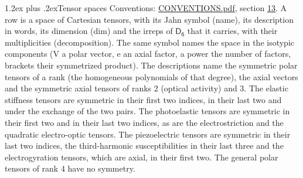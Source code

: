 \documentclass[10pt,a4paper]{article}
\makeatletter
\renewcommand\section{\@startsection{section}{1}{\z@}{-3ex plus -1ex minus -.2ex}%
  {1.2ex plus .2ex}{\normalfont\large\sffamily\bfseries\color{parttitle}}}
\numberwithin{equation}{section}
\newcommand{\grp}[1]{\mathsf{#1}}
\makeatother
\begin{document}
\section{Tensor spaces}\label{s:tensor_spaces}
Conventions: \href{../../CONVENTIONS.pdf}{CONVENTIONS.pdf}, section \href{../../CONVENTIONS.pdf\#conv.13}{13}.
\leavevmode\label{n:head.name}\label{n:head.description}\label{n:head.dim}\label{n:head.decomposition}A row is a space of Cartesian tensors, with its Jahn symbol (name), its description in words, its dimension (dim) and the irreps of $\grp{D_{6}}$ that it carries, with their multiplicities (decomposition). \label{n:label.jahn}The same symbol names the space in the isotypic components (V a polar vector, e an axial factor, a power the number of factors, brackets their symmetrized product). The descriptions name the symmetric polar tensors of a rank (the homogeneous polynomials of that degree), the axial vectors and the symmetric axial tensors of ranks 2 (optical activity) and 3. The elastic stiffness tensors are symmetric in their first two indices, in their last two and under the exchange of the two pairs. The photoelastic tensors are symmetric in their first two and in their last two indices, as are the electrostriction and the quadratic electro-optic tensors. The piezoelectric tensors are symmetric in their last two indices, the third-harmonic susceptibilities in their last three and the electrogyration tensors, which are axial, in their first two. The general polar tensors of rank 4 have no symmetry.
\end{document}
